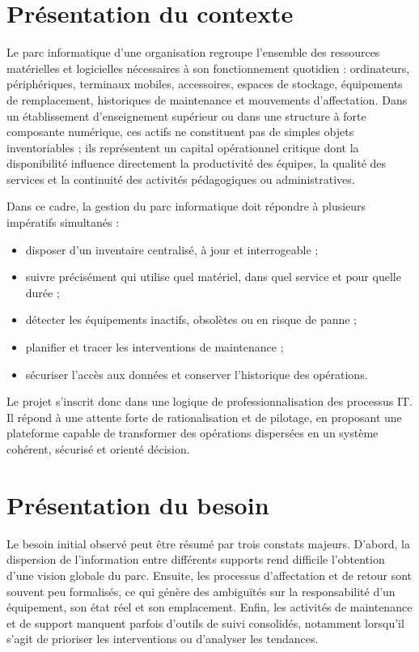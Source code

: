 ﻿\documentclass[12pt,a4paper,oneside]{report}
\begin{document}
\section{Présentation du contexte}
Le parc informatique d'une organisation regroupe l'ensemble des ressources matérielles et logicielles nécessaires à son fonctionnement quotidien : ordinateurs, périphériques, terminaux mobiles, accessoires, espaces de stockage, équipements de remplacement, historiques de maintenance et mouvements d'affectation. Dans un établissement d'enseignement supérieur ou dans une structure à forte composante numérique, ces actifs ne constituent pas de simples objets inventoriables ; ils représentent un capital opérationnel critique dont la disponibilité influence directement la productivité des équipes, la qualité des services et la continuité des activités pédagogiques ou administratives.

Dans ce cadre, la gestion du parc informatique doit répondre à plusieurs impératifs simultanés :
\begin{itemize}
  \item disposer d'un inventaire centralisé, à jour et interrogeable ;
  \item suivre précisément qui utilise quel matériel, dans quel service et pour quelle durée ;
  \item détecter les équipements inactifs, obsolètes ou en risque de panne ;
  \item planifier et tracer les interventions de maintenance ;
  \item sécuriser l'accès aux données et conserver l'historique des opérations.
\end{itemize}

Le projet s'inscrit donc dans une logique de professionnalisation des processus IT. Il répond à une attente forte de rationalisation et de pilotage, en proposant une plateforme capable de transformer des opérations dispersées en un système cohérent, sécurisé et orienté décision.

\section{Présentation du besoin}
Le besoin initial observé peut être résumé par trois constats majeurs. D'abord, la dispersion de l'information entre différents supports rend difficile l'obtention d'une vision globale du parc. Ensuite, les processus d'affectation et de retour sont souvent peu formalisés, ce qui génère des ambiguïtés sur la responsabilité d'un équipement, son état réel et son emplacement. Enfin, les activités de maintenance et de support manquent parfois d'outils de suivi consolidés, notamment lorsqu'il s'agit de prioriser les interventions ou d'analyser les tendances.
\end{document}
